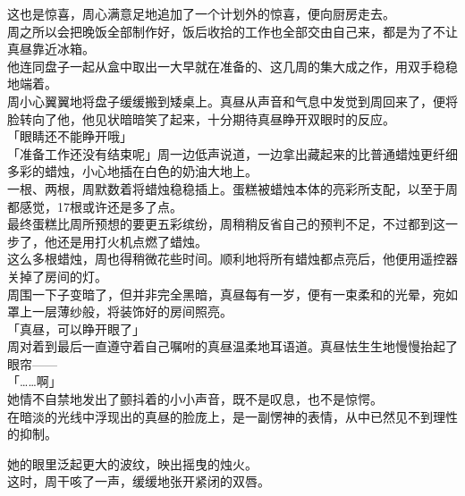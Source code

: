 这也是惊喜，周心满意足地追加了一个计划外的惊喜，便向厨房走去。\\

周之所以会把晚饭全部制作好，饭后收拾的工作也全部交由自己来，都是为了不让真昼靠近冰箱。\\

他连同盘子一起从盒中取出一大早就在准备的、这几周的集大成之作，用双手稳稳地端着。\\

周小心翼翼地将盘子缓缓搬到矮桌上。真昼从声音和气息中发觉到周回来了，便将脸转向了他，他见状暗暗笑了起来，十分期待真昼睁开双眼时的反应。\\

「眼睛还不能睁开哦」\\

「准备工作还没有结束呢」周一边低声说道，一边拿出藏起来的比普通蜡烛更纤细多彩的蜡烛，小心地插在白色的奶油大地上。\\

一根、两根，周默数着将蜡烛稳稳插上。蛋糕被蜡烛本体的亮彩所支配，以至于周都感觉，17根或许还是多了点。\\

最终蛋糕比周所预想的要更五彩缤纷，周稍稍反省自己的预判不足，不过都到这一步了，他还是用打火机点燃了蜡烛。\\

这么多根蜡烛，周也得稍微花些时间。顺利地将所有蜡烛都点亮后，他便用遥控器关掉了房间的灯。\\

周围一下子变暗了，但并非完全黑暗，真昼每有一岁，便有一束柔和的光晕，宛如罩上一层薄纱般，将装饰好的房间照亮。\\

「真昼，可以睁开眼了」\\

周对着到最后一直遵守着自己嘱咐的真昼温柔地耳语道。真昼怯生生地慢慢抬起了眼帘——\\

「……啊」\\

她情不自禁地发出了颤抖着的小小声音，既不是叹息，也不是惊愕。\\

在暗淡的光线中浮现出的真昼的脸庞上，是一副愣神的表情，从中已然见不到理性的抑制。

她的眼里泛起更大的波纹，映出摇曳的烛火。\\

这时，周干咳了一声，缓缓地张开紧闭的双唇。\\

